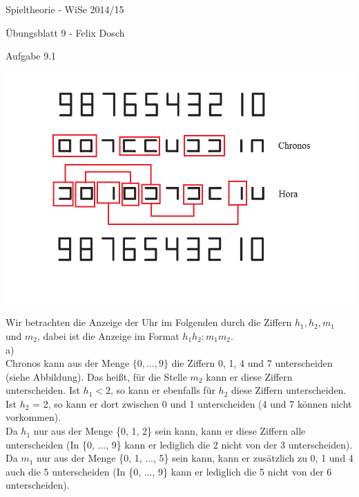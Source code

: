 \documentclass{scrartcl}
\begin{document}
\begin{LARGE}
Spieltheorie - WiSe 2014/15
\end{LARGE}

\begin{Large}
Übungsblatt 9 - Felix Dosch\\[1.0cm]
\end{Large}

\begin{Large}
Aufgabe 9.1\\[0.0cm]
\end{Large}

\includegraphics[width=1\textwidth]{times.png}

Wir betrachten die Anzeige der Uhr im Folgenden durch die Ziffern $h_1, h_2, m_1$ und $m_2$,
dabei ist die Anzeige im Format $h_1h_2:m_1m_2$. \\

a) \\

Chronos kann aus der Menge $\{0, ..., 9\}$ die Ziffern 0, 1, 4 und 7 unterscheiden (siehe
Abbildung). Das heißt, für die Stelle $m_2$ kann er diese Ziffern unterscheiden. Ist
$h_1 < 2$, so kann er ebenfalls für $h_2$ diese Ziffern unterscheiden. Ist $h_2$ = 2, so 
kann er dort zwischen 0 und 1 unterscheiden (4 und 7 können nicht vorkommen). \\

Da $h_1$ nur aus der Menge \{0, 1, 2\} sein kann, kann er diese Ziffern alle unterscheiden
(In \{0, ..., 9\} kann er lediglich die 2 nicht von der 3 unterscheiden). \\

Da $m_1$ nur aus der Menge \{0, 1, ..., 5\} sein kann, kann er zusätzlich zu 0, 1 und 4 auch
die 5 unterscheiden (In \{0, ..., 9\} kann er lediglich die 5 nicht von der 6 unterscheiden). \\
\end{document}
